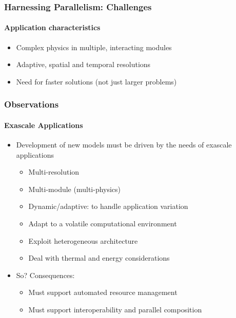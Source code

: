 {\begin{frame}[fragile]
\frametitle{Harnessing Parallelism: Challenges}
\framesubtitle{Application characteristics}
  \begin{itemize}
  \item Complex physics in multiple, interacting modules
  \item Adaptive, spatial and temporal resolutions
  \item Need for faster solutions (not just larger problems)
  \end{itemize}
\end{frame}

\begin{frame}[t]
\frametitle{Observations}
\framesubtitle{Exascale Applications}
  \begin{itemize}
    \item Development of new models must be driven by the needs of exascale applications
    \begin{itemize}
      \item Multi-resolution
      \item Multi-module (multi-physics)
      \item Dynamic/adaptive: to handle application variation
      \item Adapt to a volatile computational environment
      \item Exploit heterogeneous architecture
      \item Deal with thermal and energy considerations
    \end{itemize}
    \pause
    \item So? Consequences:
    \begin{itemize}
      \item Must support automated resource management
      \item Must support interoperability and parallel composition
    \end{itemize}
  \end{itemize}
\end{frame}
}
